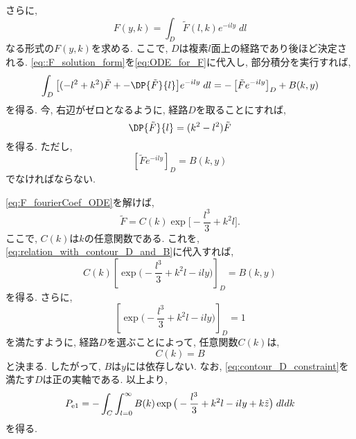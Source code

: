 さらに, 
\begin{equation}
  F(y,k) = \int_D \tilde{F} (l,k) e^{-ily} \; dl
\label{eq;F_solution_form}
\end{equation}
なる形式の$F(y,k)$を求める. 
ここで, $D$は複素$l$面上の経路であり後ほど決定される. 
\eqref{eq::F_solution_form}を\eqref{eq:ODE_for_F}に代入し, 
部分積分を実行すれば, 
\begin{equation}
  \int_D \big[ (-l^2 + k^2) \tilde{F} + - \DP{\tilde{F}}{l} \big] e^{-ily} \; dl
  = - \left[\tilde{F} e^{-ily} \right]_D + B(k,y)
\label{eq:F_fourierCoef_1}
\end{equation}
を得る. 
今, 右辺がゼロとなるように, 経路$D$を取ることにすれば, 
\begin{equation}
 \DP{\tilde{F}}{l} = (k^2 - l^2) \tilde{F}
\label{eq:F_fourierCoef_ODE}
\end{equation}
を得る. 
ただし, 
\begin{equation}
  \left[ \tilde{F} e^{-ily} \right]_D = B(k,y)
\label{eq:relation_with_contour_D_and_B}
\end{equation}
でなければならない. 

\eqref{eq:F_fourierCoef_ODE}を解けば, 
\begin{equation}
  \tilde{F} = C(k) \exp \big[ -\dfrac{l^3}{3} + k^2 l \big]. 
\end{equation}
ここで, $C(k)$は$k$の任意関数である. 
これを, \ref{eq:relation_with_contour_D_and_B}に代入すれば, 
\begin{equation}
  C(k) \left[ \exp \big( -\dfrac{l^3}{3} + k^2 l - ily \big) \right]_D = B(k,y)
\end{equation}
を得る. 
さらに, 
\begin{equation}
  \left[ \exp \big( -\dfrac{l^3}{3} + k^2 l - ily \big) \right]_D = 1
\label{eq:contour_D_constraint}
\end{equation}
を満たすように, 経路$D$を選ぶことによって, 任意関数$C(k)$は, 
\begin{equation}
  C(k) = B
\end{equation}
と決まる. 
したがって, $B$は$y$には依存しない. 
なお, \eqref{eq:contour_D_constraint}を満たす$D$は正の実軸である. 
以上より, 
\begin{equation}
  P_{\rm e1} = - \int_C \int_{l=0}^\infty B(k) 
                  \exp \big( -\dfrac{l^3}{3} + k^2 l - ily + k\tilde{z} \big) \; dl dk
 \label{eq:P_e1_solution_applyBC2}
\end{equation}
を得る. 

